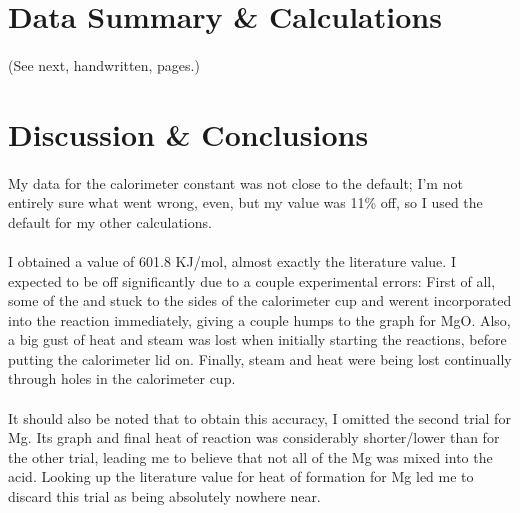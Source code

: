 \documentclass[fleqn,titlepage]{article}
\begin{document}
\section*{Data Summary \& Calculations}
  \paragraph{} (See next, handwritten, pages.)

\newpage
\section*{Discussion \& Conclusions}
\paragraph{} My data for the calorimeter constant was not close to the default; I'm not entirely sure what went wrong, even, but my value was 11\% off, so I used the default for my other calculations.
\paragraph{} I obtained a value of 601.8 KJ/mol, almost exactly the literature value. I expected to be off significantly due to a couple experimental errors: First of all, some of the  and  stuck to the sides of the calorimeter cup and werent incorporated into the reaction immediately, giving a couple humps to the graph for MgO. Also, a big gust of heat and steam was lost when initially starting the reactions, before putting the calorimeter lid on. Finally, steam and heat were being lost continually through holes in the calorimeter cup. 
\paragraph{} It should also be noted that to obtain this accuracy, I omitted the second trial for Mg. Its graph and final heat of reaction was considerably shorter/lower than for the other trial, leading me to believe that not all of the Mg was mixed into the acid. Looking up the literature value for heat of formation for Mg led me to discard this trial as being absolutely nowhere near.
\end{document}
